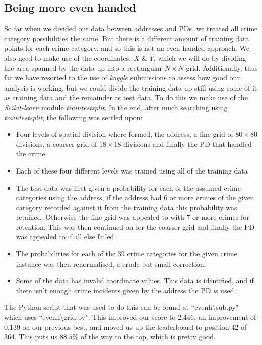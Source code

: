 \documentclass[12pt,notitlepage]{article}
\begin{document}
\subsection{Being more even handed}

So far when we divided our data between addresses and PDs, we treated all crime category possibilities the same. But there is a different amount of 
training data points for each crime category, and so this is not an even handed approach. We also need to make use of the coordinates, $X$ \& $Y$, 
which we will do by dividing the area spanned by the data up into a rectangular $N\times N$ grid. Additionally, thus far we have resorted to the use of 
\emph{kaggle} submissions to assess how good our analysis is working, but we could divide the training data up still using some of it as training data and 
the remainder as test data. To do this we make use of the \emph{Scikit-learn} module \emph{train\textunderscore test\textunderscore split}. In the end, 
after much searching using \emph{train\textunderscore test\textunderscore split}, the following was settled upon:
\begin{itemize}
\item Four levels of spatial division where formed, the address, a fine grid of $80\times80$ divisions, a coarser grid of $18\times18$ divisions and finally the PD that handled the crime. 
\item Each of these four different levels was trained using all of the training data
\item The test data was first given a probability for each of the assumed crime categories using the address, if the address had 6 or more crimes of the given category recorded against it from the training data this probability was retained. Otherwise the fine grid was appealed to with 7 or more crimes for retention. This was then continued on for the coarser grid and finally the PD was appealed to if all else failed.
\item The probabilities for each of the 39 crime categories for the given crime instance was then renormalised, a crude but small correction.
\item Some of the data has invalid coordinate values. This data is identified, and if there isn't enough crime incidents given by the address the PD is used. 
\end{itemize}

The Python script that was used to do this can be found at ``evenh\textbackslash sub.py" which uses ``evenh\textbackslash grid.py". This improved our score to 2.446, an improvement of 0.139 on our previous best, and moved us up the leaderboard to position 42 of 364. This puts us $88.5\%$ of the way to the top, which is pretty good. 
\end{document}

